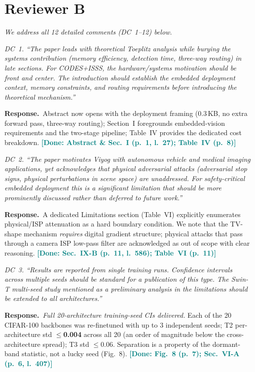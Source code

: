 \documentclass[10pt,letterpaper,journal]{IEEEtran}
\newcommand{\rc}[1]{\smallskip\noindent\textit{\textcolor{black!75}{#1}}\par\smallskip}
\newcommand{\rr}{\noindent\textbf{Response.}~}
\newcommand{\done}[1]{\textcolor{teal}{\textbf{[Done: #1]}}}
\begin{document}
\section*{Reviewer B}
\noindent\textit{We address all 12 detailed
comments (DC~1--12) below.}

\rc{DC~1. ``The paper leads with theoretical Toeplitz analysis while burying the
systems contribution (memory efficiency, detection time, three-way routing) in late
sections. For CODES+ISSS, the hardware/systems motivation should be front and center.
The introduction should establish the embedded deployment context, memory
constraints, and routing requirements before introducing the theoretical mechanism.''}

\rr Abstract now opens with the deployment framing (0.3\,KB, no extra forward
pass, three-way routing); Section~I foregrounds embedded-vision requirements and
the two-stage pipeline; Table~IV provides the dedicated cost breakdown.
\done{Abstract \& Sec.~I (p.~1, l.~27); Table~IV (p.~8)}

\rc{DC~2. ``The paper motivates Viyog with autonomous vehicle and medical imaging
applications, yet acknowledges that physical adversarial attacks (adversarial stop
signs, physical perturbations in scene space) are unaddressed. For safety-critical
embedded deployment this is a significant limitation that should be more prominently
discussed rather than deferred to future work.''}

\rr A dedicated Limitations section (Table~VI) explicitly enumerates physical/ISP
attenuation as a hard boundary condition. We note that the TV-shape mechanism
\emph{requires} digital gradient structure; physical attacks that pass through a
camera ISP low-pass filter are acknowledged as out of scope with clear reasoning.
\done{Sec.~IX-B (p.~11, l.~586); Table~VI (p.~11)}

\rc{DC~3. ``Results are reported from single training runs. Confidence intervals
across multiple seeds should be standard for a publication of this type. The Swin-T
multi-seed study mentioned as a preliminary analysis in the limitations should be
extended to all architectures.''}

\rr \emph{Full 20-architecture training-seed CIs delivered.} Each of the 20
CIFAR-100 backbones was re-finetuned with up to 3 independent seeds; T2
per-architecture std $\le$\textbf{0.004} across all 20 (an order of magnitude
below the cross-architecture spread); T3 std $\le$0.06. Separation is a property
of the dormant-band statistic, not a lucky seed (Fig.~8).
\done{Fig.~8 (p.~7); Sec.~VI-A (p.~6, l.~407)}
\end{document}
